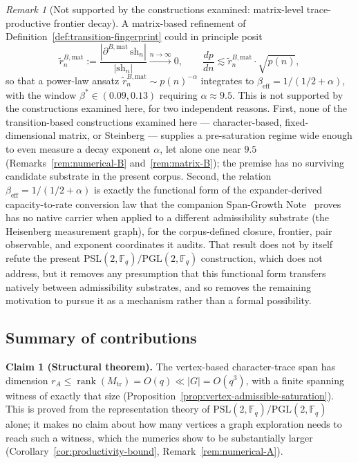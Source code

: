 \documentclass[11pt,a4paper]{article}
\theoremstyle{plain}
\theoremstyle{definition}
\theoremstyle{remark}
\newtheorem{remark}[theorem]{Remark}
\newcommand{\F}{\mathbb{F}}
\newcommand{\rank}{\operatorname{rank}}
\newcommand{\PSL}{\mathrm{PSL}}
\newcommand{\adm}{\mathrm{tr}}
\newcommand{\Madm}{M_{\adm}}
\newcommand{\rtildeB}{\tilde{r}_n^{B,\mathrm{mat}}}
\newcommand{\betaeff}{\beta_{\mathrm{eff}}}
\newcommand{\betastar}{\beta^*}
\begin{document}
      \begin{remark}[Not supported by the constructions examined: matrix-level trace-productive frontier decay]
        \label{rem:conjecture-withdrawn}
        A matrix-based refinement of Definition~\ref{def:transition-fingerprint} could in principle
        posit
        \[
          \rtildeB := \frac{|\partial^{B,\mathrm{mat}}\,\mathrm{sh}_n|}{|\mathrm{sh}_n|}
          \xrightarrow{n \to \infty} 0,
          \qquad
          \frac{dp}{dn} \lesssim \rtildeB \cdot \sqrt{p(n)},
        \]
        so that a power-law ansatz $\rtildeB \sim p(n)^{-\alpha}$ integrates to
        $\betaeff = 1/(1/2+\alpha)$, with the window $\betastar \in (0.09,0.13)$ requiring
        $\alpha \approx 9.5$.
        This is not supported by the constructions examined here, for two independent reasons.
        First, none of the transition-based constructions examined here --- character-based,
        fixed-dimensional matrix, or Steinberg --- supplies a pre-saturation regime wide enough to
        even measure a decay exponent $\alpha$, let alone one near $9.5$
        (Remarks~\ref{rem:numerical-B} and~\ref{rem:matrix-B}); the premise has no surviving
        candidate substrate in the present corpus.
        Second, the relation $\betaeff = 1/(1/2+\alpha)$ is exactly the functional form of the
        expander-derived capacity-to-rate conversion law that the companion Span-Growth
        Note~\cite{Beau2026sgn} proves has no native carrier when applied to a different
        admissibility substrate (the Heisenberg measurement graph), for the corpus-defined closure,
        frontier, pair observable, and exponent coordinates it audits.
        That result does not by itself refute the present $\PSL(2,\F_q)/\mathrm{PGL}(2,\F_q)$
        construction, which \cite{Beau2026sgn} does not address, but it removes any presumption that
        this functional form transfers natively between admissibility substrates, and so removes
        the remaining motivation to pursue it as a mechanism rather than a formal possibility.
      \end{remark}

    \subsection{Summary of contributions}
      \label{subsec:contributions-summary}

      \textbf{Claim 1 (Structural theorem).}
      The vertex-based character-trace span has dimension $r_A \le \rank(\Madm) = O(q) \ll |G| = O(q^3)$,
      with a finite spanning witness of exactly that size
      (Proposition~\ref{prop:vertex-admissible-saturation}).
      This is proved from the representation theory of $\PSL(2,\F_q)/\mathrm{PGL}(2,\F_q)$ alone; it
      makes no claim about how many vertices a graph exploration needs to reach such a witness,
      which the numerics show
      to be substantially larger (Corollary~\ref{cor:productivity-bound},
      Remark~\ref{rem:numerical-A}).
\end{document}
